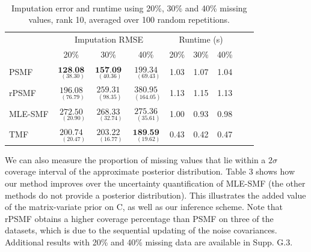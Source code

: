 \documentclass{mldsmsc}
\begin{document}
\begin{table}[H]
\centering
\label{tab:rmse10}
 \\[0.5ex]
\begin{tabular}{@{}lccc|ccccc@{}}
\toprule
 & \multicolumn{3}{c}{Imputation RMSE} & \multicolumn{3}{c}{Runtime (s)} \\
 & 20\% & 30\% & 40\% & 20\% & 30\% & 40\% \\
\midrule
PSMF & $\underset{{\scriptscriptstyle \;\;(38.30)}}{\textbf{128.08}}$ & $\underset{{\scriptscriptstyle \;\;(40.36)}}{\textbf{157.09}}$ & $\underset{{\scriptscriptstyle \;\;\;(69.43)}}{199.34}$ & 1.03 & 1.07 & 1.04 \\
rPSMF & $\underset{{\scriptscriptstyle \;\;(76.79)}}{196.08}$ & $\underset{{\scriptscriptstyle \;\;(98.35)}}{259.31}$ & $\underset{{\scriptscriptstyle \;\;(164.05)}}{380.95}$ & 1.13 & 1.15 & 1.13\\
MLE-SMF & $\underset{{\scriptscriptstyle \;\;\;(20.90)}}{272.50}$ & $\underset{{\scriptscriptstyle \;\;\;(32.74)}}{268.33}$ & $\underset{{\scriptscriptstyle \;\;\;(35.61)}}{275.36}$ & 1.00 & 0.93 & 0.98 \\
TMF & $\underset{{\scriptscriptstyle \;\;\;(20.47)}}{200.74}$ & $\underset{{\scriptscriptstyle \;\;\;(16.77)}}{203.22}$ & $\underset{{\scriptscriptstyle \;\;\;(19.62)}}{\textbf{189.59}}$ & 0.43 & 0.42 & 0.47 \\
\bottomrule
\end{tabular}
\caption{Imputation error and runtime using 20\%, 30\% and 40\% missing values, rank 10, averaged over 100 random repetitions.}
\end{table}

\noindent We can also measure the proportion of missing values that lie within a $2\sigma$ coverage interval of the approximate posterior distribution. Table 3 shows how our method improves over the uncertainty quantification of MLE-SMF (the other methods do not provide a posterior distribution). This illustrates the added value of the matrix-variate prior on C, as well as our inference scheme. Note that rPSMF obtains a higher coverage percentage than PSMF on three of the datasets, which is due to the sequential updating of the noise covariances. Additional results with 20\% and 40\% missing data are available in Supp. G.3. \newline
\end{document}
